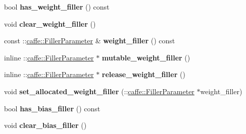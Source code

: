 \begin{DoxyCompactItemize}
\item 
\mbox{\label{classcaffe_1_1_embed_parameter_a78061b2d0175049837a223d339517e35}} 
bool {\bfseries has\+\_\+weight\+\_\+filler} () const
\item 
\mbox{\label{classcaffe_1_1_embed_parameter_a4867f9d6414dc6591f01cc6da99606ac}} 
void {\bfseries clear\+\_\+weight\+\_\+filler} ()
\item 
\mbox{\label{classcaffe_1_1_embed_parameter_a2f99dfe09c7512ecd8bbf445526c6dbc}} 
const \+::\mbox{\hyperlink{classcaffe_1_1_filler_parameter}{caffe\+::\+Filler\+Parameter}} \& {\bfseries weight\+\_\+filler} () const
\item 
\mbox{\label{classcaffe_1_1_embed_parameter_a7c0e1678e23072a10b38955d40850600}} 
inline \+::\mbox{\hyperlink{classcaffe_1_1_filler_parameter}{caffe\+::\+Filler\+Parameter}} $\ast$ {\bfseries mutable\+\_\+weight\+\_\+filler} ()
\item 
\mbox{\label{classcaffe_1_1_embed_parameter_ae60ba50c4f99c3f6df72cd34fa5cf045}} 
inline \+::\mbox{\hyperlink{classcaffe_1_1_filler_parameter}{caffe\+::\+Filler\+Parameter}} $\ast$ {\bfseries release\+\_\+weight\+\_\+filler} ()
\item 
\mbox{\label{classcaffe_1_1_embed_parameter_a46585da844ea685e5233e383d33e898d}} 
void {\bfseries set\+\_\+allocated\+\_\+weight\+\_\+filler} (\+::\mbox{\hyperlink{classcaffe_1_1_filler_parameter}{caffe\+::\+Filler\+Parameter}} $\ast$weight\+\_\+filler)
\item 
\mbox{\label{classcaffe_1_1_embed_parameter_a355c03e05110c7969308a538e8960736}} 
bool {\bfseries has\+\_\+bias\+\_\+filler} () const
\item 
\mbox{\label{classcaffe_1_1_embed_parameter_a865d94863194d965d1f0913b00482b6d}} 
void {\bfseries clear\+\_\+bias\+\_\+filler} ()
\item 
\mbox{\label{classcaffe_1_1_embed_parameter_a2fc01dd0de93ed1111285c09ed33c837}} 

\end{DoxyCompactItemize}
